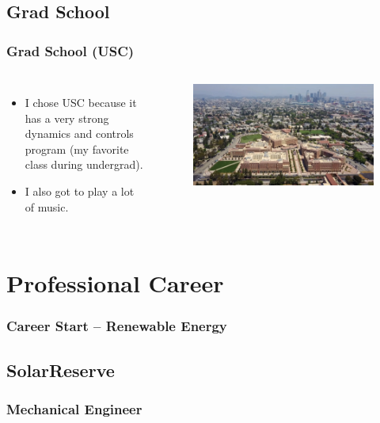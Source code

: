 \documentclass[aspectratio=169]{beamer}
\begin{document}
\subsection{Grad School}
\begin{frame}
  \frametitle{Grad School (USC)}
  \begin{columns}[t]
  \begin{itemize}
  \item I chose USC because it has a very strong dynamics and controls
    program (my favorite class during undergrad).
  \item I also got to play a lot of music.
  \end{itemize}

  \begin{figure}
    \includegraphics[width=0.7\linewidth]{USC.jpg}
  \end{figure}
  \end{columns}
\end{frame}

\section{Professional Career}

\begin{frame}
  \frametitle{Career Start -- Renewable Energy}
  
\end{frame}

\subsection{SolarReserve}
\subsubsection{Mechanical Engineer}
\end{document}
